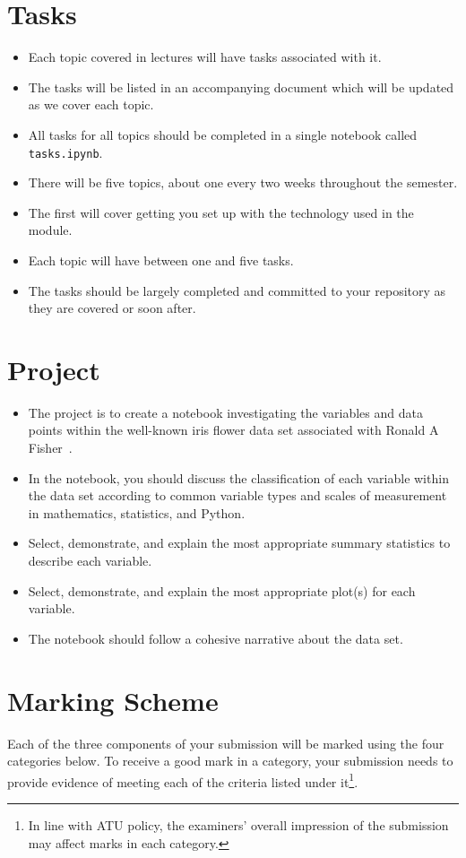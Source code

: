 \documentclass{iansnotes}
\begin{document}
\section{Tasks}

\begin{itemize}
  \item Each topic covered in lectures will have tasks associated with it.
  \item The tasks will be listed in an accompanying document which will be updated as we cover each topic.
  \item All tasks for all topics should be completed in a single notebook called \texttt{tasks.ipynb}.
  \item There will be five topics, about one every two weeks throughout the semester.
  \item The first will cover getting you set up with the technology used in the module.
  \item Each topic will have between one and five tasks.
  \item The tasks should be largely completed and committed to your repository as they are covered or soon after.
\end{itemize} 


\section{Project}

\begin{itemize}
  \item The project is to create a notebook investigating the variables and data points within the well-known iris flower data set associated with Ronald A Fisher~\autocite{irisdataset}. 
  \item In the notebook, you should discuss the classification of each variable within the data set according to common variable types and scales of measurement in mathematics, statistics, and Python.
  \item Select, demonstrate, and explain the most appropriate summary statistics to describe each variable.
  \item Select, demonstrate, and explain the most appropriate plot(s) for each variable.
  \item The notebook should follow a cohesive narrative about the data set.
\end{itemize} 


\section{Marking Scheme}
Each of the three components of your submission will be marked using the four categories below.
To receive a good mark in a category, your submission needs to provide evidence of meeting each of the criteria listed under it\footnote{In line with ATU policy, the examiners' overall impression of the submission may affect marks in each category.}.
\end{document}

